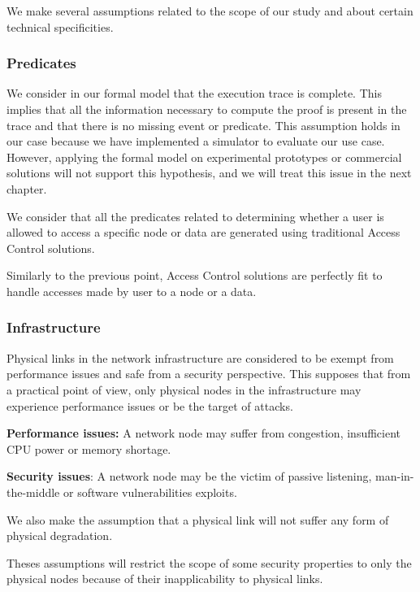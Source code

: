 We make several assumptions related to the scope of our study and about certain technical specificities.

\subsubsection{Predicates}
We consider in our formal model that the execution trace is complete.
This implies that all the information necessary to compute the proof is present in the trace and that there is no missing event or predicate.
This assumption holds in our case because we have implemented a simulator to evaluate our use case. However, applying the formal model on experimental prototypes or commercial solutions will not support this hypothesis, and we will treat this issue in the next chapter.

We consider that all the predicates related to determining whether a user is allowed to access a specific node or data are generated using traditional Access Control solutions.

Similarly to the previous point, Access Control solutions are perfectly fit to handle accesses made by user to a node or a data.


\subsubsection{Infrastructure}
Physical links in the network infrastructure are considered to be exempt from performance issues and safe from a security perspective.
This supposes that from a practical point of view, only physical nodes in the infrastructure may experience performance issues or be the target of attacks.

\textbf{Performance issues:} A network node may suffer from congestion, insufficient CPU power or memory shortage. 

\textbf{Security issues}: A network node may be the victim of passive listening, man-in-the-middle or software vulnerabilities exploits.

We also make the assumption that a physical link will not suffer any form of physical degradation.

Theses assumptions will restrict the scope of some security properties to only the physical nodes because of their inapplicability to physical links.

